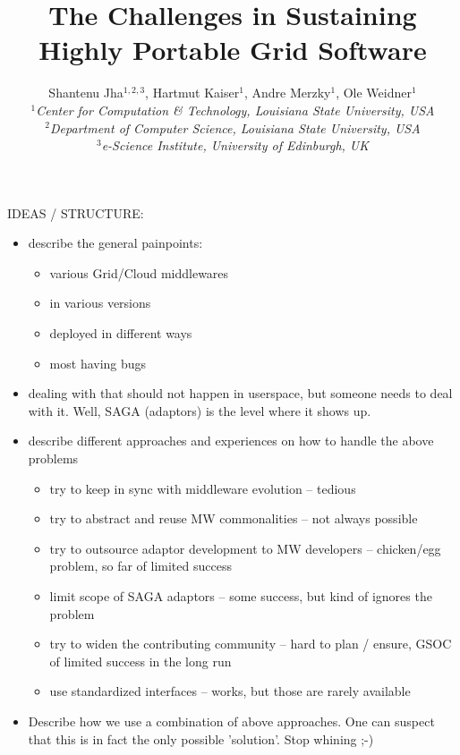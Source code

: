 \documentclass[a4paper,10pt]{article}
\begin{document}
 \title{\large The Challenges in Sustaining Highly Portable Grid Software}
 
 \author{Shantenu Jha$^{1,2,3}$, Hartmut Kaiser$^{1}$, Andre Merzky$^{1}$, Ole Weidner$^{1}$ \\
   \small{\emph{$^{1}$Center for Computation \& Technology, Louisiana State University, USA}}\\
   \small{\emph{$^{2}$Department of Computer Science, Louisiana State University, USA}}\\
   \small{\emph{$^{3}$e-Science Institute, University of Edinburgh, UK}}
 }
 
 \maketitle
 
 IDEAS / STRUCTURE:
 
 \begin{itemize}
 
  \item describe the general painpoints:
   \begin{itemize}
    \item various Grid/Cloud middlewares
    \item in various versions
    \item deployed in different ways
    \item most having bugs
   \end{itemize}
 
  \item dealing with that should not happen in userspace, but someone
   needs to deal with it.  Well, SAGA (adaptors) is the level where it
   shows up.
 
  \item describe different approaches and experiences on how to handle
   the above problems
   \begin{itemize}
    \item try to keep in sync with middleware evolution 
     -- tedious
    \item try to abstract and reuse MW commonalities 
     -- not always possible
    \item try to outsource adaptor development to MW developers
     -- chicken/egg problem, so far of limited success
    \item limit scope of SAGA adaptors
     -- some success, but kind of ignores the problem
    \item try to widen the contributing community
     -- hard to plan / ensure, GSOC of limited success in the long run
    \item use standardized interfaces
     -- works, but those are rarely available
   \end{itemize}
 
  \item Describe how we use a combination of above approaches.  One
   can  suspect that this is in fact the only possible 'solution'.
   Stop whining ;-)  
 
 \end{itemize}
 
  
 
\end{document}
